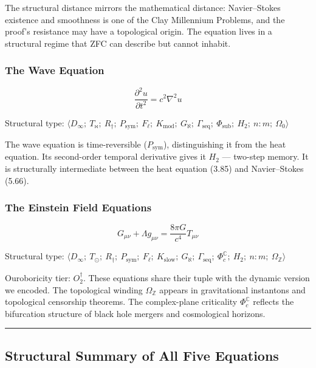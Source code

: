 \documentclass[12pt,a4paper]{article}
\begin{document}
The structural distance mirrors the mathematical distance: Navier--Stokes existence and smoothness is one of the Clay Millennium Problems, and the proof's resistance may have a topological origin. The equation lives in a structural regime that ZFC can describe but cannot inhabit.

\subsubsection{The Wave Equation}

\[\frac{\partial^2 u}{\partial t^2} = c^2\nabla^2 u\]

Structural type: $\langle D_{\infty};\ T_{\bowtie};\ R_{\dagger};\ P_\text{sym};\ F_{\ell};\ K_\text{mod};\ G_{\aleph};\ \Gamma_\text{seq};\ \Phi_\text{sub};\ H_2;\ n{:}m;\ \Omega_0 \rangle$

The wave equation is time-reversible ($P_\text{sym}$), distinguishing it from the heat equation. Its second-order temporal derivative gives it $H_2$ --- two-step memory. It is structurally intermediate between the heat equation (3.85) and Navier--Stokes (5.66).

\subsubsection{The Einstein Field Equations}

\[G_{\mu\nu} + \Lambda g_{\mu\nu} = \frac{8\pi G}{c^4}T_{\mu\nu}\]

Structural type: $\langle D_{\infty};\ T_{\odot};\ R_{\dagger};\ P_\text{sym};\ F_{\ell};\ K_\text{slow};\ G_{\aleph};\ \Gamma_\text{seq};\ \Phi_c^\mathbb{C};\ H_2;\ n{:}m;\ \Omega_\mathbb{Z} \rangle$

Ouroboricity tier: $O_2^\dagger$. These equations share their tuple with the dynamic version we encoded. The topological winding $\Omega_\mathbb{Z}$ appears in gravitational instantons and topological censorship theorems. The complex-plane criticality $\Phi_c^\mathbb{C}$ reflects the bifurcation structure of black hole mergers and cosmological horizons.

\begin{center}
\rule{0.5\textwidth}{0.4pt}
\end{center}

\subsection{Structural Summary of All Five Equations}
\end{document}
